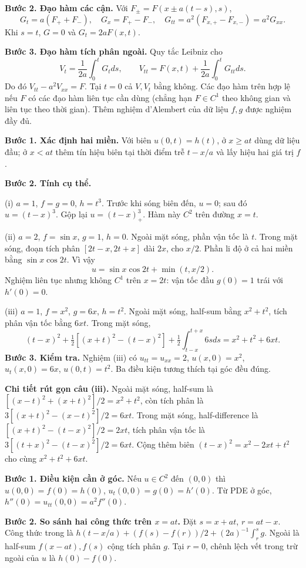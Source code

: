 \textbf{Bước 2. Đạo hàm các cận.} Với $F_\pm=F(x\pm a(t-s),s)$,
\[G_t=a(F_++F_-),\quad G_x=F_+-F_-,\quad G_{tt}=a^2(F_{x,+}-F_{x,-})=a^2G_{xx}.\]
Khi $s=t$, $G=0$ và $G_t=2aF(x,t)$.

\textbf{Bước 3. Đạo hàm tích phân ngoài.} Quy tắc Leibniz cho
\[V_t=\frac1{2a}\int_0^tG_tds,\qquad V_{tt}=F(x,t)+\frac1{2a}\int_0^tG_{tt}ds.\]
Do đó $V_{tt}-a^2V_{xx}=F$. Tại $t=0$ cả $V,V_t$ bằng không. Các đạo hàm trên hợp lệ nếu $F$ có các đạo hàm liên tục cần dùng (chẳng hạn $F\in C^1$ theo không gian và liên tục theo thời gian). Thêm nghiệm d'Alembert của dữ liệu $f,g$ được nghiệm đầy đủ.

\textbf{Bước 1. Xác định hai miền.} Với biên $u(0,t)=h(t)$, ở $x\ge at$ dùng dữ liệu đầu; ở $x<at$ thêm tín hiệu biên tại thời điểm trễ $t-x/a$ và lấy hiệu hai giá trị $f$.

\textbf{Bước 2. Tính cụ thể.}

(i) $a=1$, $f=g=0$, $h=t^3$. Trước khi sóng biên đến, $u=0$; sau đó $u=(t-x)^3$. Gộp lại $u=(t-x)_+^3$. Hàm này $C^2$ trên đường $x=t$.

(ii) $a=2$, $f=\sin x$, $g=1$, $h=0$. Ngoài mặt sóng, phần vận tốc là $t$. Trong mặt sóng, đoạn tích phân $[2t-x,2t+x]$ dài $2x$, cho $x/2$. Phần li độ ở cả hai miền bằng $\sin x\cos2t$. Vì vậy
\[u=\sin x\cos2t+\min(t,x/2).\]
Nghiệm liên tục nhưng không $C^1$ trên $x=2t$: vận tốc đầu $g(0)=1$ trái với $h'(0)=0$.

(iii) $a=1$, $f=x^2$, $g=6x$, $h=t^2$. Ngoài mặt sóng, half-sum bằng $x^2+t^2$, tích phân vận tốc bằng $6xt$. Trong mặt sóng,
\[(t-x)^2+\tfrac12[(x+t)^2-(t-x)^2]+\tfrac12\int_{t-x}^{t+x}6sds=x^2+t^2+6xt.\]
\textbf{Bước 3. Kiểm tra.} Nghiệm (iii) có $u_{tt}=u_{xx}=2$, $u(x,0)=x^2$, $u_t(x,0)=6x$, $u(0,t)=t^2$. Ba điều kiện tương thích tại góc đều đúng.

\textbf{Chi tiết rút gọn câu (iii).} Ngoài mặt sóng, half-sum là $[(x-t)^2+(x+t)^2]/2=x^2+t^2$, còn tích phân là $3[(x+t)^2-(x-t)^2]/2=6xt$. Trong mặt sóng, half-difference là $[(x+t)^2-(t-x)^2]/2=2xt$, tích phân vận tốc là $3[(t+x)^2-(t-x)^2]/2=6xt$. Cộng thêm biên $(t-x)^2=x^2-2xt+t^2$ cho cùng $x^2+t^2+6xt$.

\textbf{Bước 1. Điều kiện cần ở góc.} Nếu $u\in C^2$ đến $(0,0)$ thì $u(0,0)=f(0)=h(0)$, $u_t(0,0)=g(0)=h'(0)$. Từ PDE ở góc, $h''(0)=u_{tt}(0,0)=a^2f''(0)$.

\textbf{Bước 2. So sánh hai công thức trên $x=at$.} Đặt $s=x+at$, $r=at-x$. Công thức trong là $h(t-x/a)+(f(s)-f(r))/2+(2a)^{-1}\int_r^s g$. Ngoài là half-sum $f(x-at),f(s)$ cộng tích phân $g$. Tại $r=0$, chênh lệch vết trong trừ ngoài của $u$ là $h(0)-f(0)$.

